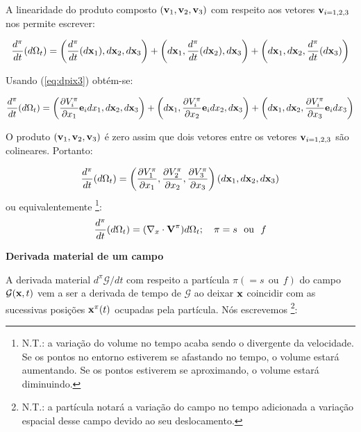 \documentclass[
	11pt, %
	fleqn, %
	a4paper, %
]{LegrandOrangeBook}
\begin{document}
A linearidade do produto composto $(\textbf{v}_1, \textbf{v}_2, \textbf{v}_3)$ com respeito aos vetores $\textbf{v}_{i=1,2,3}$ nos permite escrever: 

\begin{equation}
	\label{eq:derivadavolumematerial1}	
	\dfrac{d^\pi}{dt}(d\Omega_t) = \left(\dfrac{d^\pi}{dt}(d\textbf{x}_1),d\textbf{x}_2,d\textbf{x}_3\right) + \left(d\textbf{x}_1,\dfrac{d^\pi}{dt}(d\textbf{x}_2),d\textbf{x}_3\right)+\left(d\textbf{x}_1,d\textbf{x}_2,\dfrac{d^\pi}{dt}(d\textbf{x}_3)\right)
\end{equation}

Usando (\ref{eq:dpix3}) obtém-se:

\begin{equation}
	\label{eq:derivadavolumematerial2}	
	\dfrac{d^\pi}{dt}(d\Omega_t) = \left(\dfrac{\partial V_i^\pi}{\partial x_1}\textbf{e}_idx_1,d\textbf{x}_2,d\textbf{x}_3\right) + \left(d\textbf{x}_1,\dfrac{\partial V_i^\pi}{\partial x_2}\textbf{e}_idx_2,d\textbf{x}_3\right)+\left(d\textbf{x}_1,d\textbf{x}_2,\dfrac{\partial V_i^\pi}{\partial x_3}\textbf{e}_idx_3\right)
\end{equation}

O produto $(\textbf{v}_1,\textbf{v}_2,\textbf{v}_3)$ é zero assim que dois vetores entre os vetores $\textbf{v}_{i=1,2,3}$ são colineares. Portanto:

\begin{equation}
	\label{eq:derivadavolumematerial3}	
	\dfrac{d^\pi}{dt}(d\Omega_t) = \left(\dfrac{\partial V_1^\pi}{\partial x_1},\dfrac{\partial V_2^\pi}{\partial x_2},\dfrac{\partial V_3^\pi}{\partial x_3}\right)(d\textbf{x}_1,d\textbf{x}_2,d\textbf{x}_3)
\end{equation}
ou equivalentemente \footnote{N.T.: a variação do volume no tempo acaba sendo o divergente da velocidade. Se os pontos no entorno estiverem se afastando no tempo, o volume estará aumentando. Se os pontos estiverem se aproximando, o volume estará diminuindo.}:
\begin{equation}
	\label{eq:derivadavolumematerial3}	
	\dfrac{d^\pi}{dt}(d\Omega_t) = (\nabla_x \cdot \textbf{V}^\pi)d\Omega_t; ~~~ \pi = s ~~\text{ou} ~~ f
\end{equation}

\textbf{Derivada material de um campo}

A derivada material $d^\pi \mathcal{G}/dt$ com respeito a partícula $\pi (=s~~\text{ou}~~f)$ do campo $\mathcal{G}(\textbf{x}, t)$ vem a ser a derivada de tempo de $\mathcal{G}$ ao deixar $\textbf{x}$ coincidir com as sucessivas posições $\textbf{x}^{\pi}(t)$ ocupadas pela partícula. Nós escrevemos \footnote{N.T.: a partícula notará a variação do campo no tempo adicionada a variação espacial desse campo devido ao seu deslocamento.}:
\end{document}
